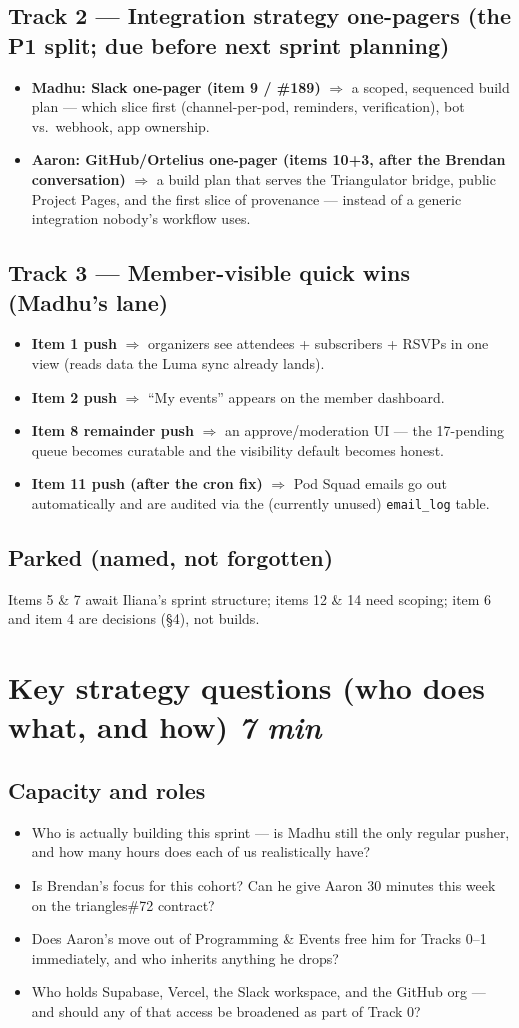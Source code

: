 \documentclass[10pt]{article}
\newcommand{\gh}[1]{\mbox{\##1}}
\newcommand{\tbox}[1]{\hfill {\normalsize\normalfont\itshape #1}}
\newcommand{\push}[2]{\item \textbf{#1} $\Rightarrow$ #2}
\begin{document}
\subsection{Track 2 --- Integration strategy one-pagers (the P1 split; due before next sprint planning)}
\begin{itemize}
  \push{Madhu: Slack one-pager (item 9 / \gh{189})}{a scoped, sequenced build plan --- which slice first (channel-per-pod, reminders, verification), bot vs.\ webhook, app ownership.}
  \push{Aaron: GitHub/Ortelius one-pager (items 10+3, after the Brendan conversation)}{a build plan that serves the Triangulator bridge, public Project Pages, and the first slice of provenance --- instead of a generic integration nobody's workflow uses.}
\end{itemize}

\subsection{Track 3 --- Member-visible quick wins (Madhu's lane)}
\begin{itemize}
  \push{Item 1 push}{organizers see attendees + subscribers + RSVPs in one view (reads data the Luma sync already lands).}
  \push{Item 2 push}{``My events'' appears on the member dashboard.}
  \push{Item 8 remainder push}{an approve/moderation UI --- the 17-pending queue becomes curatable and the visibility default becomes honest.}
  \push{Item 11 push (after the cron fix)}{Pod Squad emails go out automatically and are audited via the (currently unused) \texttt{email\_log} table.}
\end{itemize}

\subsection{Parked (named, not forgotten)}
Items 5 \& 7 await Iliana's sprint structure; items 12 \& 14 need scoping; item 6 and item 4 are decisions (\S4), not builds.

\section{Key strategy questions (who does what, and how) \tbox{7 min}}
\subsection{Capacity and roles}
\begin{itemize}
  \item Who is actually building this sprint --- is Madhu still the only regular pusher, and how many hours does each of us realistically have?
  \item Is Brendan's focus  for this cohort? Can he give Aaron 30 minutes this week on the triangles\gh{72} contract?
  \item Does Aaron's move out of Programming \& Events free him for Tracks 0--1 immediately, and who inherits anything he drops?
  \item Who holds Supabase, Vercel, the Slack workspace, and the GitHub org --- and should any of that access be broadened as part of Track 0?
\end{itemize}
\end{document}
